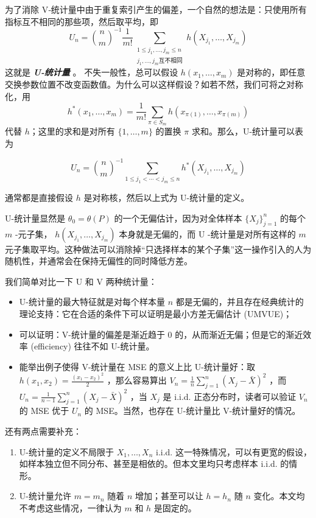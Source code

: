 为了消除 V‑统计量中由于重复索引产生的偏差，一个自然的想法是：只使用所有指标互不相同的那些项，然后取平均，即
\[U_n={\binom nm}^{-1}\frac1{m!}\sum_{\substack{1\le j_1,\dots,j_m\le n\\ j_1,\dots,j_m \text{互不相同}}}h(X_{j_1},\dots,X_{j_m})\]
这就是 \textbf{\emph{U-统计量}} 。 不失一般性，总可以假设 $h(x_1,\dots,x_m)$ 是对称的，即任意交换参数位置不改变函数值。为什么可以这样假设？如若不然，我们可将之对称化，用
\[
h^*(x_1,\dots,x_m)
=\frac1{m!}\sum_{\pi\in S_m}h(x_{\pi(1)},\dots,x_{\pi(m)})
\]
代替 $h$；这里的求和是对所有 $\{1,\dots,m\}$ 的置换 $\pi$ 求和。那么，U-统计量可以表为

\begin{equation}
\label{eq:ch10a:tag-2}
U_n={\binom nm}^{-1}\sum_{1\le j_1<\cdots<j_m\le n}h^*(X_{j_1},\dots,X_{j_m})
\end{equation}

通常都是直接假设 $h$ 是对称核，然后以上式为 U-统计量的定义。

U-统计量显然是 $\theta_0=\theta(P)$ 的一个无偏估计，因为对全体样本 $\{X_j\}_{j=1}^n$ 的每个 $m$ -元子集， $h(X_{j_1},\dots,X_{j_m})$ 本身就是无偏的，而 U -统计量是对所有这样的 $m$ 元子集取平均。这种做法可以消除掉``只选择样本的某个子集''这一操作引入的人为随机性，并通常会在保持无偏性的同时降低方差。

我们简单对比一下 U 和 V 两种统计量：

\begin{itemize}
\tightlist
\item
  U-统计量的最大特征就是对每个样本量 $n$ 都是无偏的，并且存在经典统计的理论支持：它在合适的条件下可以证明是最小方差无偏估计 (UMVUE)；
\item
  可以证明：V-统计量的偏差是渐近趋于 0 的，从而渐近无偏；但是它的渐近效率 (eﬃciency) 往往不如 U-统计量。
\item
  能举出例子使得 V-统计量在 MSE 的意义上比 U-统计量好：取 $h(x_1,x_2)=\frac{(x_1-x_2)^2}{2}$ ，那么容易算出 $V_n=\frac1n\sum_{j=1}^n(X_j-\bar X)^2$ ，而 $U_n=\frac1{n-1}\sum_{j=1}^n(X_j-\bar X)^2$ ，当 $X_j$ 是 i.i.d. 正态分布时，读者可以验证 $V_n$ 的 MSE 优于 $U_n$ 的 MSE。当然，也存在 U-统计量比 V-统计量好的情况。
\end{itemize}

还有两点需要补充：

\begin{enumerate}
\def\labelenumi{\arabic{enumi}.}
\tightlist
\item
  U-统计量的定义不局限于 $X_1,\dots,X_n$ i.i.d. 这一特殊情况，可以有更宽的假设，如样本独立但不同分布、甚至是相依的。但本文里均只考虑样本 i.i.d. 的情形。
\item
  U-统计量允许 $m=m_n$ 随着 $n$ 增加；甚至可以让 $h=h_n$ 随 $n$ 变化。本文均不考虑这些情况，一律认为 $m$ 和 $h$ 是固定的。
\end{enumerate}

